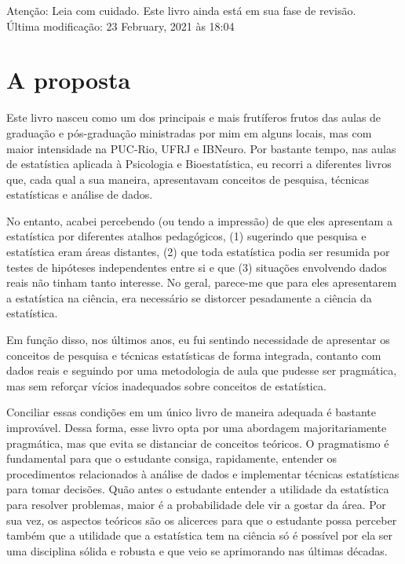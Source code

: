 \documentclass[
]{book}
\begin{document}
Atenção: Leia com cuidado. Este livro ainda está em sua fase de revisão.\\
Última modificação: 23 February, 2021 às 18:04

\hypertarget{a-proposta}{%
\section{A proposta}\label{a-proposta}}

Este livro nasceu como um dos principais e mais frutíferos frutos das aulas de graduação e pós-graduação ministradas por mim em alguns locais, mas com maior intensidade na PUC-Rio, UFRJ e IBNeuro. Por bastante tempo, nas aulas de estatística aplicada à Psicologia e Bioestatística, eu recorri a diferentes livros que, cada qual a sua maneira, apresentavam conceitos de pesquisa, técnicas estatísticas e análise de dados.

No entanto, acabei percebendo (ou tendo a impressão) de que eles apresentam a estatística por diferentes atalhos pedagógicos, (1) sugerindo que pesquisa e estatística eram áreas distantes, (2) que toda estatística podia ser resumida por testes de hipóteses independentes entre si e que (3) situações envolvendo dados reais não tinham tanto interesse. No geral, parece-me que para eles apresentarem a estatística na ciência, era necessário se distorcer pesadamente a ciência da estatística.

Em função disso, nos últimos anos, eu fui sentindo necessidade de apresentar os conceitos de pesquisa e técnicas estatísticas de forma integrada, contanto com dados reais e seguindo por uma metodologia de aula que pudesse ser pragmática, mas sem reforçar vícios inadequados sobre conceitos de estatística.

Conciliar essas condições em um único livro de maneira adequada é bastante improvável. Dessa forma, esse livro opta por uma abordagem majoritariamente pragmática, mas que evita se distanciar de conceitos teóricos. O pragmatismo é fundamental para que o estudante consiga, rapidamente, entender os procedimentos relacionados à análise de dados e implementar técnicas estatísticas para tomar decisões. Quão antes o estudante entender a utilidade da estatística para resolver problemas, maior é a probabilidade dele vir a gostar da área. Por sua vez, os aspectos teóricos são os alicerces para que o estudante possa perceber também que a utilidade que a estatística tem na ciência só é possível por ela ser uma disciplina sólida e robusta e que veio se aprimorando nas últimas décadas.
\end{document}
